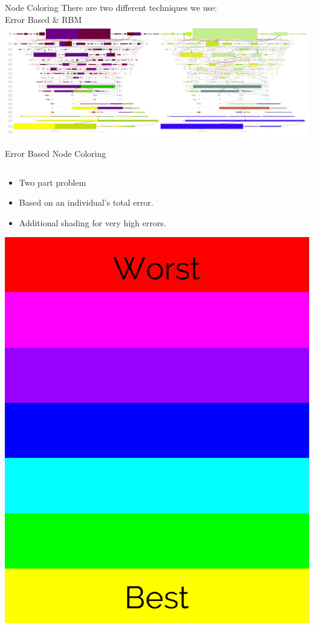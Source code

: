 \documentclass{beamer}
\begin{document}
\begin{frame}{Node Coloring}
\center
{There are two different techniques we use:  \\ Error Based  \&  RBM}
\includegraphics[width=\textwidth]{Illustrations/run0_dual_and_RBM_full.pdf}
\end{frame}

\begin{frame}{Error Based Node Coloring}
\begin{columns}
\begin{column}{.4\textwidth}
\begin{itemize}
\item Two part problem
\item Based on an individual's total error.
\item Additional shading for very high errors.
\end{itemize}
\center
\includegraphics[height=0.4\textheight]{Illustrations/colorrange.pdf}

\end{column}
\end{columns}
\end{frame}
\end{document}
